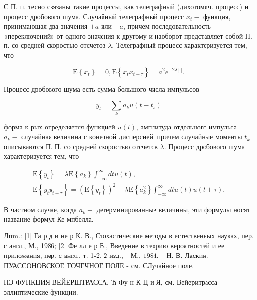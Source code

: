 \documentclass[10pt]{article}
\begin{document}
С П. п. тесно связаны такие процессы, как телеграфный (дихотомич. процесс) и процесс дробового шума. Случайный телеграфный процесс $x_{t}-$ функция, принимаюшая два значения $+a$ или $-a$, причем последовательность «переключений» от одного значения к другому и наоборот представляет собой П. п. со средней скоростью отсчетов $\lambda$. Телеграфный процесс характеризуется тем, что



\[

\mathrm{E}\left\{x_{t}\right\}=0, \mathrm{E}\left\{x_{t} x_{t+\tau}\right\}=a^{2} e^{-2 \lambda|\tau|} .

\]



Процесс дробового шума есть сумма большого числа импульсов



\[

y_{t}=\sum_{k} a_{k} u\left(t-t_{k}\right)

\]



форма к-рых определяется функцией $u(t)$, амплитуда отдельного импульса $a_{k}-$ случайная величина с конечной дисперсией, причем случайные моменты $t_{k}$ описываются П. П. со средней скоростью отсчетов $\lambda$. Процесс дробового шума характеризуется тем, что



\[

\begin{gathered}

\mathrm{E}\left\{y_{t}\right\}=\lambda \mathrm{E}\left\{a_{k}\right\} \int_{-\infty}^{\infty} d t u(t), \\

\mathrm{E}\left\{y_{t} y_{t+\tau}\right\}=\left(\mathrm{E}\left\{y_{t}\right\}\right)^{2}+\lambda \mathrm{E}\left\{a_{k}^{2}\right\} \int_{-\infty}^{\infty} d t u(t) u(t+\tau) .

\end{gathered}

\]



В частном случае, когда $a_{k}-$ детерминированные величины, эти формулы носят название формул Ке мпбелла.



Лum.: [1] Га р д и не р К. В., Стохастические методы в естественных науках, пер. с англ., М., 1986; [2] Фе лл е р В., Введение в теорию вероятностей и ее приложения, пер. с англ., т. 1-2, 2 изд., $\begin{array}{ll}\text { М., } 1984 . & \text { Н. В. Ласкин. }\end{array}$ ПУАССОНОВСКОЕ ТОЧЕЧНОЕ ПОЛЕ - см. СЛучайное поле.



ПЭ-ФУНКЦИЯ ВЕЙЕРШТРАССА, Ћ-Фу н К Ц и Я, см. Вейеритрасса эллиптические функции.
\end{document}
